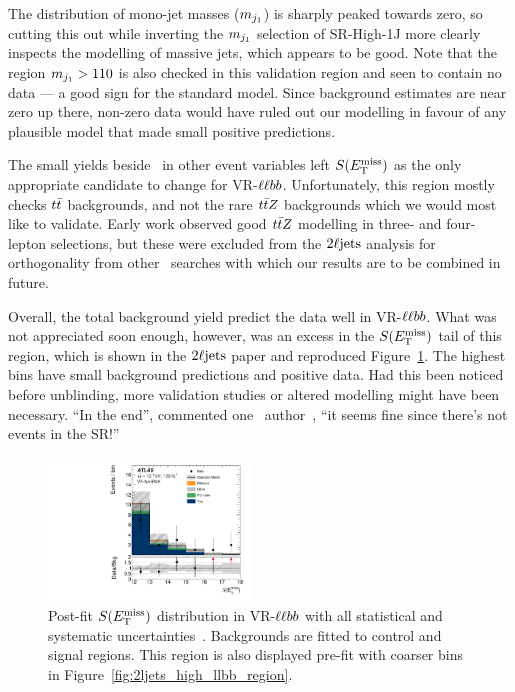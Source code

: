 The distribution of mono-jet masses ($m_{j_1}$) is sharply peaked towards zero,
so cutting this out while inverting the $m_{j_1}$ selection of SR-High-1J
more clearly inspects the modelling of massive jets, which appears to be good.
Note that the region $m_{j_1} > 110$ is also checked in this validation region
and seen to contain no data --- a good sign for the standard model.
Since background estimates are near zero up there, non-zero data would have
ruled out our modelling in favour of any plausible model that made small
positive predictions.

The small yields beside \srllbb\ in other event variables left $\metsig$ as
the only appropriate candidate to change for VR-$\llbb$.
Unfortunately, this region mostly checks $t\bar t$ backgrounds, and not the
rare $t\bar t Z$ backgrounds which we would most like to validate.
Early work observed good $t\bar t Z$ modelling in three- and four- lepton
selections, but these were excluded from the $2\ell\mathrm{jets}$ analysis for
orthogonality from other \atlas\ searches with which our results are to be
combined in future.

Overall, the total background yield predict the data well in VR-$\llbb$.
What was not appreciated soon enough, however, was an excess in the $\metsig$
tail of this region, which is shown in the $2\ell\mathrm{jets}$ paper and reproduced
Figure~\ref{fig:2ljets_high_metsig_vrllbb_paper}.
The highest bins have small background predictions and positive data.
Had this been noticed before unblinding, more validation studies or altered
modelling might have been necessary.
``In the end'', commented one \atlas\ author~\cite{comment2022vrllbb},
``it seems fine since there's not events in the SR!''

\begin{figure}[tp]
\centering
\includegraphics[width=0.48\textwidth]{figures/2ljets_vr_llbb_met_sig.pdf}
\caption[
Post-fit $\metsig$ distribution in VR-$\llbb$
]{%
Post-fit $\metsig$ distribution in VR-$\llbb$ with all statistical and
systematic uncertainties~\cite{atlas2022searches}.
Backgrounds are fitted to control and signal regions.
This region is also displayed pre-fit with coarser bins in
Figure~\ref{fig:2ljets_high_llbb_region}.
}
\label{fig:2ljets_high_metsig_vrllbb_paper}
\end{figure}


